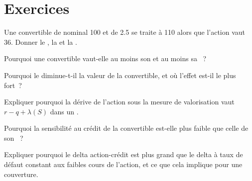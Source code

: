 \section{Exercices}

\begin{exercise}[$\star$]\label{exo:dv:convertibles-and-the-credit-equity-link:1}
Une convertible de nominal 100 et de  2.5 se traite à 110 alors que l'action vaut 36. Donner le , la  et la
.
\end{exercise}

\begin{exercise}[$\star$]\label{exo:dv:convertibles-and-the-credit-equity-link:2}
Pourquoi une convertible vaut-elle au moins son  et au moins sa ~?
\end{exercise}

\begin{exercise}[$\star$]\label{exo:dv:convertibles-and-the-credit-equity-link:3}
Pourquoi le  diminue-t-il la valeur de la convertible, et où l'effet est-il le plus fort~?
\end{exercise}

\begin{exercise}[$\star\star$]\label{exo:dv:convertibles-and-the-credit-equity-link:4}
Expliquer pourquoi la dérive de l'action sous la mesure de valorisation vaut $r-q+\lambda(S)$ dans un .
\end{exercise}

\begin{exercise}[$\star\star$]\label{exo:dv:convertibles-and-the-credit-equity-link:5}
Pourquoi la sensibilité au crédit de la convertible est-elle plus faible que celle de son ~?
\end{exercise}

\begin{exercise}[$\star\star$]\label{exo:dv:convertibles-and-the-credit-equity-link:6}
Expliquer pourquoi le delta action-crédit est plus grand que le delta à taux de défaut constant aux faibles cours de l'action, et ce que cela implique pour une couverture.
\end{exercise}

